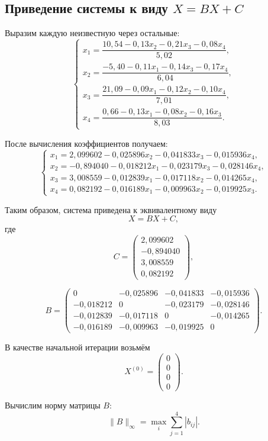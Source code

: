 \subsection{Приведение системы к виду $X=BX+C$}

Выразим каждую неизвестную через остальные:
\[
\begin{cases}
x_1=\dfrac{10{,}54-0{,}13x_2-0{,}21x_3-0{,}08x_4}{5{,}02},\\[8pt]
x_2=\dfrac{-5{,}40-0{,}11x_1-0{,}14x_3-0{,}17x_4}{6{,}04},\\[8pt]
x_3=\dfrac{21{,}09-0{,}09x_1-0{,}12x_2-0{,}10x_4}{7{,}01},\\[8pt]
x_4=\dfrac{0{,}66-0{,}13x_1-0{,}08x_2-0{,}16x_3}{8{,}03}.
\end{cases}
\]

После вычисления коэффициентов получаем:
\[
\begin{cases}
x_1=2{,}099602-0{,}025896x_2-0{,}041833x_3-0{,}015936x_4,\\
x_2=-0{,}894040-0{,}018212x_1-0{,}023179x_3-0{,}028146x_4,\\
x_3=3{,}008559-0{,}012839x_1-0{,}017118x_2-0{,}014265x_4,\\
x_4=0{,}082192-0{,}016189x_1-0{,}009963x_2-0{,}019925x_3.
\end{cases}
\]

Таким образом, система приведена к эквивалентному виду
\[
X=BX+C,
\]
где
\[
C=
\begin{pmatrix}
2{,}099602\\
-0{,}894040\\
3{,}008559\\
0{,}082192
\end{pmatrix},
\]

\[
B=
\begin{pmatrix}
0 & -0{,}025896 & -0{,}041833 & -0{,}015936\\
-0{,}018212 & 0 & -0{,}023179 & -0{,}028146\\
-0{,}012839 & -0{,}017118 & 0 & -0{,}014265\\
-0{,}016189 & -0{,}009963 & -0{,}019925 & 0
\end{pmatrix}.
\]

В качестве начальной итерации возьмём
\[
X^{(0)}=
\begin{pmatrix}
0\\
0\\
0\\
0
\end{pmatrix}.
\]

Вычислим норму матрицы $B$:
\[
\|B\|_{\infty}=\max_i\sum_{j=1}^{4}|b_{ij}|.
\]

